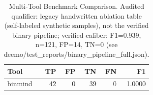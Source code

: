 \begin{table}[ht]
\centering
\caption{Multi-Tool Benchmark Comparison. Audited qualifier: legacy handwritten ablation table (self-labeled synthetic samples), not the verified binary pipeline; verified caliber: F1=0.939, n=121, FP=14, TN=0 (see deemo/test_reports/binary_pipeline_full.json).}
\label{tab:multitool}
\begin{tabular}{lrrrrr}
\toprule
Tool & TP & FP & TN & FN & F1 \\
\midrule
binmind & 42 & 0 & 39 & 0 & 1.0000 \\ %
\bottomrule
\end{tabular}
\end{table}

